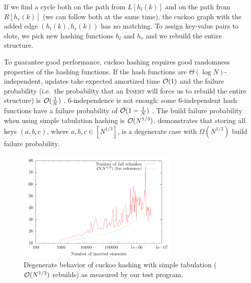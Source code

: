 If we find a cycle both on the path from $L[h_l(k)]$ and on the path from
$R[h_r(k)]$ (we can follow both at the same time), the cuckoo graph with
the added edge $(h_l(k),h_r(k))$ has no matching. To assign key-value pairs
to slots, we pick new hashing functions $h_l$ and $h_r$ and we rebuild
the entire structure.

To guarantee good performance, cuckoo hashing requires good randomness
properties of the hashing functions.
If the hash functions are $\Theta(\log N)$-independent, updates take expected
amortized time $\mathcal{O}(1)$ and the failure probability (i.e.\ the probability that
an \textsc{Insert} will force us to rebuild the entire structure) is
$\mathcal{O}(\frac{1}{N})$ \cite{cuckoo-hashing}.
6-independence is not enough: some 6-independent hash functions have a
failure probability of $\mathcal{O}(1-\frac{1}{N})$ \cite{cuckoo-hashing-indep-bounds}.
The build failure probability when using simple tabulation hashing is
$\mathcal{O}(N^{1/3})$. \cite{power-of-simple-tab} demonstrates that storing all keys
$(a,b,c)$, where $a,b,c\in[N^{1/3}]$, is a degenerate case with
$\Omega(N^{1/3})$ build failure probability.

\begin{figure}
	\centering
	\includegraphics[width=0.7\textwidth]{img/cuckoo/results}
	\caption{Degenerate behavior of cuckoo hashing
		with simple tabulation ($\mathcal{O}(N^{1/3})$ rebuilds)
		as measured by our test program.}
\end{figure}

